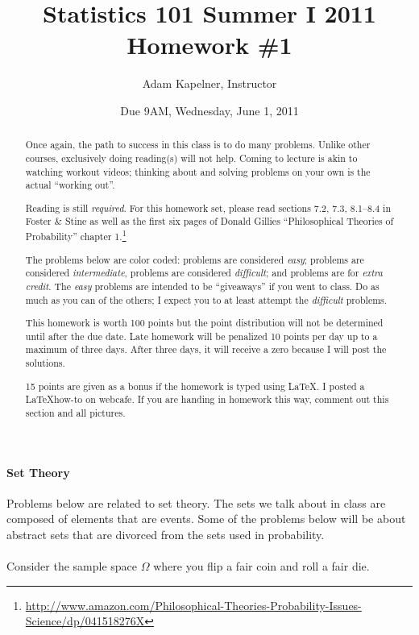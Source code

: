 \documentclass[12pt]{article}
\title{Statistics 101 Summer I 2011 \\ Homework \#1}
\author{Adam Kapelner, Instructor}
\date{Due 9AM, Wednesday, June 1, 2011}
\begin{document}
\maketitle


\begin{abstract}
Once again, the path to success in this class is to do many problems. Unlike other courses, exclusively doing reading(s) will not help. Coming to lecture is akin to watching workout videos; thinking about and solving problems on your own is the actual ``working out''. 

Reading is still \textit{required}. For this homework set, please read sections 7.2, 7.3, 8.1--8.4 in Foster \& Stine as well as the first six pages of Donald Gillies ``Philosophical Theories of Probability'' chapter 1.\footnote{\url{http://www.amazon.com/Philosophical-Theories-Probability-Issues-Science/dp/041518276X}}

The problems below are color coded:  problems are considered \textit{easy};  problems are considered \textit{intermediate},  problems are considered \textit{difficult}; and  problems are for \textit{extra credit}. The \textit{easy} problems are intended to be ``giveaways'' if you went to class. Do as much as you can of the others; I expect you to at least attempt the \textit{difficult} problems.

This homework is worth 100 points but the point distribution will not be determined until after the due date. Late homework will be penalized 10 points per day up to a maximum of three days. After three days, it will receive a zero because I will post the solutions. 

15 points are given as a bonus if the homework is typed using \LaTeX. I posted a \LaTeX how-to on webcafe. If you are handing in homework this way, comment out this section and all pictures.
\end{abstract}

\paragraph{Set Theory} Problems below are related to set theory. The sets we talk about in class are composed of elements that are events. Some of the problems below will be about abstract sets that are divorced from the sets used in probability.\\ \\

\problem Consider the sample space $\Omega$ where you flip a fair coin and roll a fair die.
\end{document}
